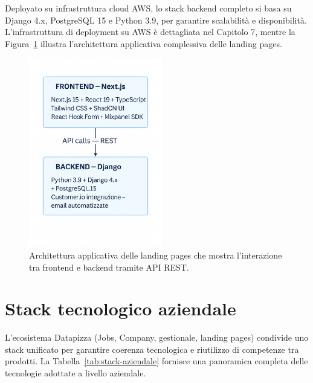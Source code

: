 Deployato su infrastruttura cloud AWS, lo stack backend completo si basa su 
Django 4.x, PostgreSQL 15 e Python 3.9, per garantire scalabilità e disponibilità. 
L'infrastruttura di deployment su AWS è dettagliata nel Capitolo 7, mentre 
la Figura~\ref{fig:stack-landing} illustra l'architettura applicativa 
complessiva delle landing pages.

\begin{figure}[h!]
    \centering
    \includegraphics[width=0.52\textwidth]{chapters/figures/stack2.pdf}
    \caption{Architettura applicativa delle landing pages che mostra 
    l'interazione tra frontend e backend 
 tramite API REST.}
    \label{fig:stack-landing}
\end{figure}

\clearpage

\section{Stack tecnologico aziendale}

L'ecosistema Datapizza (Jobs, Company, gestionale, landing pages) condivide 
uno stack unificato per garantire coerenza tecnologica e riutilizzo di competenze 
tra prodotti. La Tabella~\ref{tab:stack-aziendale} fornisce una panoramica 
completa delle tecnologie adottate a livello aziendale.

